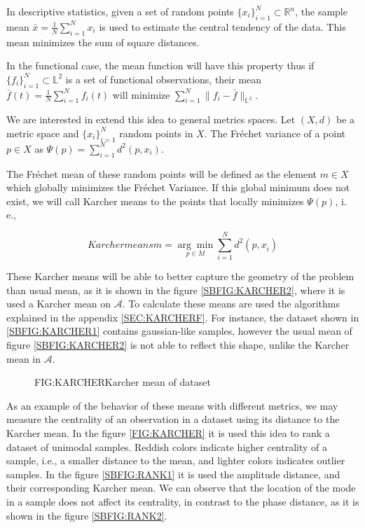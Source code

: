 In descriptive statistics, given a set of random points
$\{x_i\}_{i=1}^{N} \subset \mathbb{R}^n$, the sample mean
$\bar x = \frac{1}{N}\sum_{i=1}^{N} x_i$ is used to estimate the central
tendency of the data. This mean minimizes the sum of square distances.

In the functional case, the mean function will have this property thus if
$\{f_i\}_{i=1}^{N} \subset \mathbb{L}^2$ is a set of functional observations,
their mean $\bar f(t) = \frac{1}{N}\sum_{i=1}^{N} f_i(t)$ will minimize
$\sum_{i=1}^{N}\|f_i - \bar f\|_{\mathbb{L}^2}$.

We are interested in extend this idea to general metrics spaces.
Let $(X, d)$ be a metric space and $\{x_i\}_{i=1}^{N}$ random points in $X$.
The Fréchet variance of a point $p \in X$ as $\Psi(p)=\sum_{i=1}^{N} d^{2}\left(p, x_{i}\right)$.

The Fréchet mean of these random points will be defined as the element $m \in X$
which globally minimizes the Fréchet Variance. If this global minimum does not
exist, we will call Karcher means to the points that locally minimizes
$\Psi(p)$, i. e.,

\begin{equation}[]{Karcher means}
m=\underset{p \in M}{\arg \min } \sum_{i=1}^{N} d^{2}\left(p, x_{\dot{i}}\right)
\end{equation}

These Karcher means will be able to better capture the geometry of the problem
than usual mean, as it is shown in the figure \ref{SBFIG:KARCHER2}, where it is
used a Karcher mean on $\mathscr{A}$.
To calculate these means are used the algorithms explained in the appendix \ref{SEC:KARCHERF}.
For instance, the dataset shown in \ref{SBFIG:KARCHER1} contains gaussian-like
samples, however the usual mean of figure \ref{SBFIG:KARCHER2} is not able to reflect
this shape, unlike the Karcher mean in $\mathscr{A}$.

\begin{figure}[Karcher mean of dataset]{FIG:KARCHER}{Karcher mean of dataset}
	 \quad
	 \\
	 \quad
\end{figure}

As an example of the behavior of these means with different metrics, we may
measure the centrality of an observation in a dataset using its distance to the
Karcher mean. In the figure \ref{FIG:KARCHER} it is used this idea to rank a dataset of
unimodal samples. Reddish colors indicate higher centrality of a sample, i.e.,
a smaller distance to the mean, and lighter colors indicates outlier samples.
In the figure \ref{SBFIG:RANK1} it is used the amplitude distance, and their
corresponding Karcher mean. We can observe that the location of the mode in a
sample does not affect its centrality, in contrast to the phase distance,
as it is shown in the figure \ref{SBFIG:RANK2}.


